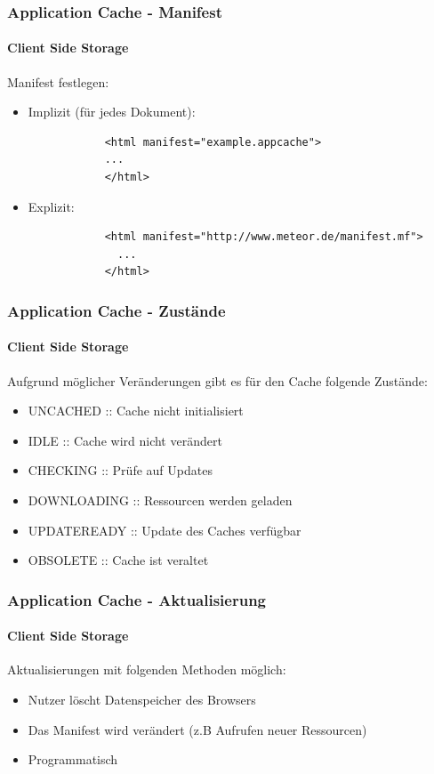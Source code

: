 \begin{frame}[fragile]
\frametitle{Application Cache - Manifest}
\framesubtitle{Client Side Storage}

	Manifest festlegen:
	\begin{itemize}
		\item Implizit (für jedes Dokument):
			\begin{lstlisting}
			<html manifest="example.appcache">
			...
			</html>
			\end{lstlisting}
		\item Explizit:
			\begin{lstlisting}
			<html manifest="http://www.meteor.de/manifest.mf">
			  ...
			</html>
			\end{lstlisting}
		
	\end{itemize}

\end{frame}
\begin{frame}
\frametitle{Application Cache - Zustände}
\framesubtitle{Client Side Storage}

	Aufgrund möglicher Veränderungen gibt es für den Cache folgende Zustände:
	\begin{itemize}
		\item UNCACHED :: Cache nicht initialisiert
		\item IDLE :: Cache wird nicht verändert
		\item CHECKING :: Prüfe auf Updates
		\item DOWNLOADING :: Ressourcen werden geladen
		\item UPDATEREADY :: Update des Caches verfügbar
		\item OBSOLETE :: Cache ist veraltet
	\end{itemize}
\end{frame}
\begin{frame}
\frametitle{Application Cache - Aktualisierung}
\framesubtitle{Client Side Storage}

	Aktualisierungen mit folgenden Methoden möglich:
	\begin{itemize}
		\item Nutzer löscht Datenspeicher des Browsers
		\item Das Manifest wird verändert (z.B Aufrufen neuer Ressourcen)
		\item Programmatisch
	\end{itemize}
\end{frame}

